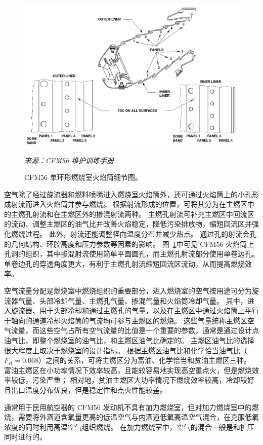 \begin{figure}[!ht]
    \centering
    \includegraphics[width=0.8\linewidth]{combustor-liner.png}
    \caption{CFM56 单环形燃烧室火焰筒细节图。}
    \label{fig:part-3-combustor-liner}
    \textit{\small 来源：CFM56 维护训练手册}
\end{figure}

空气除了经过旋流器和燃料喷嘴进入燃烧室火焰筒外，还可通过火焰筒上的小孔形成射流而进入火焰筒并参与燃烧。
根据射流形成的位置，可将其分为在主燃区中的主燃孔射流和在主燃区外的掺混射流两种。
主燃孔射流可补充主燃区中回流区的流动、调整主燃区的油气比并改善火焰稳定，降低污染排放物，缩短回流区并强化燃烧过程。
此外，射流还能调整径向温度分布并减少热点。
通过孔的射流会孔的几何结构、环腔高度和压力参数等因素的影响。
图~\ref{fig:part-3-combustor-liner}中可见 CFM56 火焰筒上孔洞的组织，其中掺混射流使用简单平圆圆孔，而主燃孔射流部分使用单卷边孔。
单卷边孔的穿透角度更大，有利于主燃孔射流缩短回流区流动，从而提高燃烧效率。

空气流量分配是燃烧室中燃烧组织的重要部分，进入燃烧室的空气按用途可分为旋流器气量、头部冷却气量、主燃孔气量、掺混气量和火焰筒冷却气量。
其中，进入旋流器、用于头部冷却和通过主燃孔的气量，以及在主燃区中通过火焰筒上平行于轴向的通道冷却火焰筒的气流均可参与主燃区的燃烧。
这些气量统称主燃区空气流量，而这些空气占所有空气流量的比值是一个重要的参数，通常是通过设计点油气比，即整个燃烧室的油气比，和主燃区油气比确定的。
主燃区油气比的选择很大程度上取决于燃烧室的设计指标。
根据主燃区油气比和化学恰当油气比（$F_\text{st} = 0.068$）之间的关系，可将主燃区分为富油、化学恰当和贫油主燃区三种。
富油主燃区在小功率情况下效率较高，且能较容易地实现高空重点火，但是燃烧效率较低，污染严重；
相对地，贫油主燃区大功率情况下燃烧效率较高，冷却较好且出口温度分布优良，但是稳定性和点火性能较差。

通常用于民用航空器的 CFM56 发动机不具有加力燃烧室，但对加力燃烧室中的燃烧，需要将外涵道含氧量更高的低温空气与内涵道低氧高温空气混合，在克服低氧浓度的同时利用高温空气组织燃烧。
在加力燃烧室中，空气的混合一般是和扩压同时进行的。

